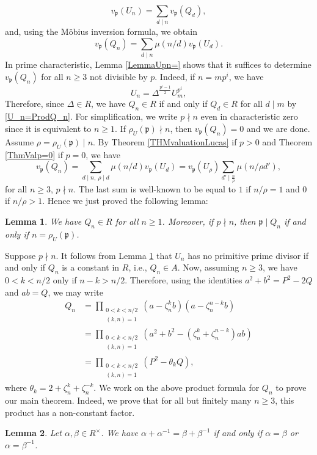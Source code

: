 \documentclass[reqno]{amsart}
\newtheorem{lemma}{Lemma}
\begin{document}
\[
v_\mathfrak{p}(U_n)=\sum_{d\mid n} v_\mathfrak{p}(Q_d),
\]
and, using the M\" obius inversion formula, we obtain
\[{}
v_\mathfrak{p}(Q_n) = \sum_{d\mid n} \mu(n/d)v_\mathfrak{p}(U_d).
\]
In prime characteristic, Lemma \ref{LemmaUpn=} shows that it suffices to determine $v_\mathfrak{p}(Q_n)$ for all $n\geq 3$ not divisible by $p$. Indeed, if $n=mp^i$, we have
\[
U_n = \Delta^{\frac{p^i-1}{2}} U_m^{p^i},
\]
Therefore, since $\Delta\in R$, we have $Q_n\in R$ if and only if $Q_d \in R$ for all $d\mid m$ by \eqref{U_n=ProdQ_n}.
For simplification, we write $p\nmid n$ even in characteristic zero since it is equivalent to $n\geq 1$. If $\rho_U(\mathfrak{p})\nmid n$, then $v_\mathfrak{p}(Q_n)=0$ and we are done. Assume $\rho =\rho_U(\mathfrak{p})\mid n$. By Theorem \ref{THMvaluationLucas} if $p>0$ and Theorem \ref{ThmValp=0} if $p=0$, we have
\[
v_\mathfrak{p}(Q_n) = \sum_{d\mid n,\ \rho \mid d} \mu(n/d)v_\mathfrak{p}(U_d) =  v_\mathfrak{p}(U_\rho) \sum_{d' \mid \frac{n}{\rho}} \mu(n/\rho d'),
\]
for all $n\geq 3$, $p\nmid n$. The last sum is well-known to be equal to $1$ if $n/\rho=1$ and $0$ if $n/\rho>1$. Hence we just proved the following lemma:
\begin{lemma}\label{LemmaQnUn}
    We have $Q_n\in R$ for all $n\geq 1$. Moreover, if $p\nmid n$, then $\mathfrak{p}\mid Q_n$ if and only if $n=\rho_U(\mathfrak{p})$.
\end{lemma}
Suppose $p\nmid n$. It follows from Lemma \ref{LemmaQnUn} that $U_n$ has no primitive prime divisor if and only if $Q_n$ is a constant in $R$, i.e., $Q_n\in A$. Now, assuming $n\geq 3$, we have $0<k<n/2$ only if $n-k>n/2$. Therefore, using the identities $a^2+b^2=P^2-2Q$ and $ab=Q$, we may write
\begin{align}
    Q_n &= \prod_{\substack{0<k<n/2 \\ (k,n)=1}} (a-\zeta_n^kb)(a-\zeta_n^{n-k}b) \nonumber \\ 
    &=\prod_{\substack{0<k<n/2 \\ (k,n)=1}} (a^2+b^2-(\zeta_n^k+\zeta_n^{n-k})ab ) \nonumber \\
    &= \prod_{\substack{0<k<n/2 \\ (k,n)=1}} (P^2-\theta_kQ), \label{QnProdFormula}
\end{align}
where $\theta_k=2+\zeta_n^k+\zeta_n^{-k}$. We work on the above product formula for $Q_n$ to prove our main theorem. Indeed, we prove that for all but finitely many $n\geq 3$, this product has a non-constant factor.


\begin{lemma}\label{Lemmaa+a-1}
    Let $\alpha,\beta\in R^\times$. We have $\alpha+\alpha^{-1} = \beta+\beta^{-1}$ if and only if $\alpha=\beta$ or $\alpha=\beta^{-1}$.
\end{lemma}
\end{document}

